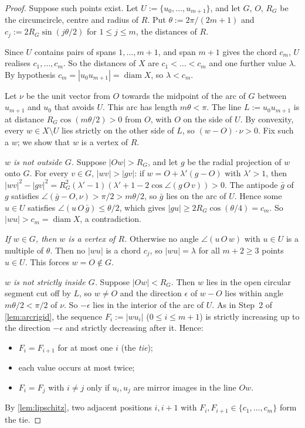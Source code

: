 \begin{proof}
Suppose such points exist. Let $U:=\{u_0,\dots,u_{m+1}\}$, and let $G$, $O$, $R_G$ be the circumcircle, centre and radius of $R$. Put $\theta:=2\pi/(2m+1)$ and $c_j:=2R_G\sin(j\theta/2)$ for $1\le j\le m$, the distances of $R$.

Since $U$ contains pairs of spans $1,\dots,m+1$, and span $m+1$ gives the chord $c_m$, $U$ realises $c_1,\dots,c_m$. So the distances of $X$ are $c_1<\dots<c_m$ and one further value $\lambda$. By hypothesis $c_m=|u_0u_{m+1}|=\operatorname{diam}X$, so $\lambda<c_m$.

Let $\nu$ be the unit vector from $O$ towards the midpoint of the arc of $G$ between $u_{m+1}$ and $u_0$ that avoids $U$. This arc has length $m\theta<\pi$. The line $L:=u_0u_{m+1}$ is at distance $R_G\cos(m\theta/2)>0$ from $O$, with $O$ on the side of $U$. By convexity, every $w\in X\setminus U$ lies strictly on the other side of $L$, so $(w-O)\cdot\nu>0$. Fix such a $w$; we show that $w$ is a vertex of $R$.

\emph{$w$ is not outside $G$.} Suppose $|Ow|>R_G$, and let $g$ be the radial projection of $w$ onto $G$. For every $v\in G$, $|wv|>|gv|$: if $w=O+\lambda'(g-O)$ with $\lambda'>1$, then $|wv|^2-|gv|^2=R_G^2(\lambda'-1)(\lambda'+1-2\cos\angle(g\,O\,v))>0$. The antipode $\bar g$ of $g$ satisfies $\angle(\bar g-O,\nu)>\pi/2>m\theta/2$, so $\bar g$ lies on the arc of $U$. Hence some $u\in U$ satisfies $\angle(u\,O\,\bar g)\le\theta/2$, which gives $|gu|\ge2R_G\cos(\theta/4)=c_m$. So $|wu|>c_m=\operatorname{diam}X$, a contradiction.

\emph{If $w\in G$, then $w$ is a vertex of $R$.} Otherwise no angle $\angle(u\,O\,w)$ with $u\in U$ is a multiple of $\theta$. Then no $|wu|$ is a chord $c_j$, so $|wu|=\lambda$ for all $m+2\ge3$ points $u\in U$. This forces $w=O\notin G$.

\emph{$w$ is not strictly inside $G$.} Suppose $|Ow|<R_G$. Then $w$ lies in the open circular segment cut off by $L$, so $w\ne O$ and the direction $\epsilon$ of $w-O$ lies within angle $m\theta/2<\pi/2$ of $\nu$. So $-\epsilon$ lies in the interior of the arc of $U$. As in Step~2 of \cref{lem:arcrigid}, the sequence $F_i:=|wu_i|$ ($0\le i\le m+1$) is strictly increasing up to the direction $-\epsilon$ and strictly decreasing after it. Hence:
\begin{itemize}[leftmargin=2em]
\item $F_i=F_{i+1}$ for at most one $i$ (the \emph{tie});
\item each value occurs at most twice;
\item $F_i=F_j$ with $i\ne j$ only if $u_i,u_j$ are mirror images in the line $Ow$.
\end{itemize}
By \cref{lem:lipschitz}, two adjacent positions $i,i+1$ with $F_i,F_{i+1}\in\{c_1,\dots,c_m\}$ form the tie.


\end{proof}
